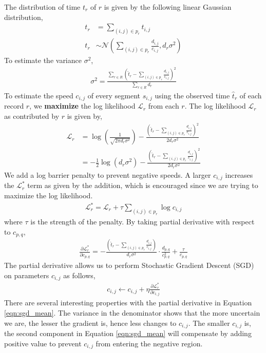 \documentclass[conference]{IEEEtran.1.8}
\begin{document}
The distribution of time $t_r$ of $r$ is given by the following linear Gaussian distribution,
\begin{align*}
	t_r &= \sum_{ (i,j) \in p_r } t_{i,j} \\
	t_r &\sim \mathcal{N} \left( \sum_{ (i,j) \in p_r } \frac{ d_{i,j} }{ c_{i,j} }, d_r \sigma^2 \right)
\end{align*}
To estimate the variance $\sigma^2$,
\begin{align*}
	\sigma^2 = \frac{ \sum_{r \in R} \left( \hat{t}_r - \sum_{ (i,j) \in p_r } \frac{d_{i,j}}{c_{i,j}} \right)^2}{\sum_{r \in R} d_r}
\end{align*}
To estimate the speed $c_{i,j}$ of every segment $s_{i,j}$ using the observed time $\hat{t}_r$ of each record $r$, we \textbf{maximize} the log likelihood $\mathcal{L}_r$ from each $r$. The log likelihood $\mathcal{L}_r$ as contributed by $r$ is given by,
\begin{align*}
	\mathcal{L}_r &= \log \left( \frac{1}{\sqrt{2 \pi d_r \sigma^2 }} \right) - \frac{\left( \hat{t}_r - \sum_{ (i,j) \in p_r } \frac{d_{i,j}}{c_{i,j}} \right)^2}{2 d_r \sigma^2 } \\
	&= - \frac{1}{2} \log \left( d_r \sigma^2 \right) - \frac{\left( \hat{t}_r - \sum_{ (i,j) \in p_r } \frac{d_{i,j}}{c_{i,j}} \right)^2}{2 d_r \sigma^2 }
\end{align*}
We add a log barrier penalty to prevent negative speeds. A larger $c_{i,j}$ increases the $\mathcal{L}^*_r$ term as given by the addition, which is encouraged since we are trying to maximize the log likelihood.
\begin{align}
	\label{eqn:objective1}
	\mathcal{L}^*_r = \mathcal{L}_r + \tau \sum_{(i,j) \in p_r} \log c_{i,j}
\end{align}
where $\tau$ is the strength of the penalty. By taking partial derivative with respect to $c_{p,q}$,
\begin{align}
	\label{eqn:sgd_mean}
	\frac{\partial \mathcal{L}^*_r}{\partial c_{p,q}} = - \frac{\left( \hat{t}_r - \sum_{ (i,j) \in p_r } \frac{d_{i,j}}{c_{i,j}} \right)}{d_r \sigma^2 } \cdot \frac{d_{p,q}}{c_{p,q}^2} + \frac{\tau}{c_{p,q}}
\end{align}
The partial derivative allows us to perform Stochastic Gradient Descent (SGD) on parameters $c_{i,j}$ as follows,
\begin{align*}
	c_{i,j} \leftarrow c_{i,j} + \eta \frac{\partial \mathcal{L}^*_r}{\partial c_{i,j}}
\end{align*}
There are several interesting properties with the partial derivative in Equation \ref{eqn:sgd_mean}. The variance in the denominator shows that the more uncertain we are, the lesser the gradient is, hence less changes to $c_{i,j}$. The smaller $c_{i,j}$ is, the second component in Equation \ref{eqn:sgd_mean} will compensate by adding positive value to prevent $c_{i,j}$ from entering the negative region.
\end{document}
